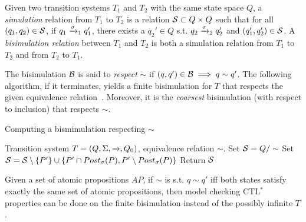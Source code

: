 \begin{defn}
	\label{defn:simulation}	
	Given two transition systems $T_1$ and $T_2$ with the same state space $Q$,
	a \emph{simulation} relation from $T_1$ to $T_2$ is a relation $\mathcal{S} \subset Q \times Q$ such that 
	for all $(q_1,q_2) \in \mathcal{S}$, if $q_1 \xrightarrow{\sigma}_1 q_1'$, there exists a $q_2' \in Q$ s.t. $q_2 \xrightarrow{\sigma}_2 q_2'$ and $(q_1',q_2') \in \mathcal{S}$.
	A \emph{bisimulation relation} between $T_1$ and $T_2$ is both a simulation relation from $T_1$ to $T_2$ and from $T_2$ to $T_1$.
\end{defn}
%
The bisimulation $\mathcal{B}$ is said to \emph{respect} $\sim$ if $(q,q') \in \mathcal{B} \implies q \sim q'$.
%
The following algorithm, if it terminates, yields a finite bisimulation for $T$ that respects the given equivalence relation~\cite{AlurHLP00ieee}.
Moreover, it is the \emph{coarsest} bisimulation (with respect to inclusion) that respects $\sim$.
\begin{algorithm}[t]
		\caption{Computing a bismimulation respecting $\sim$}
		\label{algo:bisimulation}
		\begin{algorithmic}
			\Require Transition system $T = (Q,\Sigma,\xrightarrow{},Q_0)$, equivalence relation $\sim$.
			\State Set $\mathcal{S} = Q/\sim$			
				\State Set $\mathcal{S} = \mathcal{S} \setminus \{P'\} \cup \{P' \cap Post_\sigma(P) , P' \setminus Post_\sigma(P) \}$
			\EndWhile	
			\State Return $\mathcal{S}$
		\end{algorithmic}
\end{algorithm}
Given a set of atomic propositions $AP$, if $\sim$ is s.t. $q \sim q'$ iff both states satisfy exactly the same set of atomic propositions, then model checking CTL$^*$ properties can be done on the finite bisimulation instead of the possibly infinite $T$.



%
